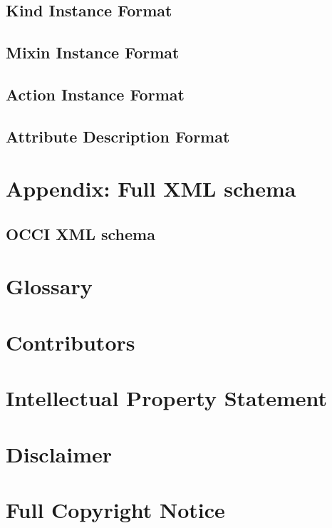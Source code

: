 \documentclass[10pt,a4paper]{article}
\begin{document}
\subsection{Kind Instance Format}
\label{sec:format_kind}

\subsection{Mixin Instance Format}
\label{sec:format_mixin}

\subsection{Action Instance Format}
\label{sec:format_action}

\subsection{Attribute Description Format}
\label{sec:format_attribute_description}

\section{Appendix: Full XML schema}
\label{sec:full_xml_schema}

\subsection{OCCI XML schema}
\label{sec:occi_xml_schema}



\section{Glossary}
\label{sec:glossary}


\section{Contributors}


\section{Intellectual Property Statement}


\section{Disclaimer}


\section{Full Copyright Notice}




\end{document}
